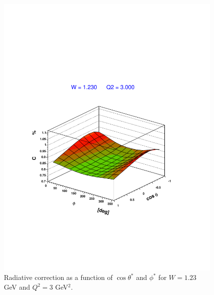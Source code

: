 \begin{figure}[h]
 \begin{center}
  \includegraphics[width=15cm, bb=0 130 540 600]{analysis/img/costheta_phi_radcor_w1.23_q3.00}
  \caption[Radiative correction as a function of $\cos\theta^*$ and $\phi^*$ for $W=1.23$ GeV and $Q^2=3$ GeV$^2$]
          { Radiative correction as a function of $\cos\theta^*$ and $\phi^*$ for $W=1.23$ GeV and $Q^2=3$ GeV$^2$.}
 \label{fig:costheta_phi_radcor_w1.23_q3.00}
  \end{center} 
\end{figure} 

